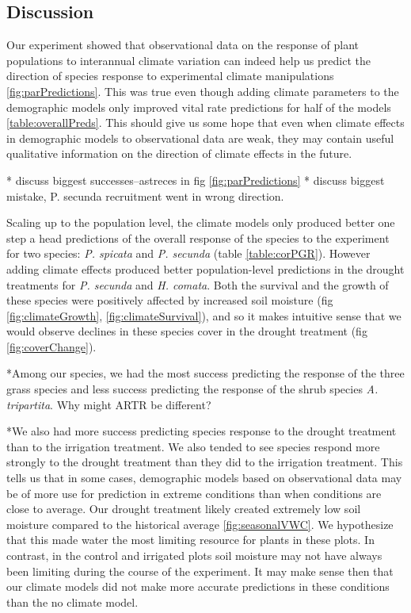 \documentclass[11pt]{article}
\begin{document}
\begin{doublespacing}
\section*{Discussion}

Our experiment showed that observational data on the response of plant populations to interannual climate variation can indeed help us predict the direction of species response to experimental climate manipulations \ref{fig:parPredictions}. This was true even though adding climate parameters to the demographic models only improved vital rate predictions for half of the models \ref{table:overallPreds}. This should give us some hope that even when climate effects in demographic models to observational data are weak, they may contain useful qualitative information on the direction of climate effects in the future. 

* discuss biggest successes--astreces in fig \ref{fig:parPredictions}
* discuss biggest mistake, P. secunda recruitment went in wrong direction. 
 
Scaling up to the population level, the climate models only produced better one step a head predictions of the overall response of the species to the experiment for two species: \textit{P. spicata} and \textit{P. secunda} (table \ref{table:corPGR}). However adding climate effects produced better population-level predictions in the drought treatments for \textit{P. secunda} and \textit{H. comata}.  Both the survival and the growth of these species were positively affected by increased soil moisture (fig \ref{fig:climateGrowth}, \ref{fig:climateSurvival}), and so it makes intuitive sense that we would observe declines in these species cover in the drought treatment (fig \ref{fig:coverChange}). 

*Among our species, we had the most success predicting the response of the three grass species and less success predicting the response of the shrub species \textit{A. tripartita}.    Why might ARTR be different? 

*We also had more success predicting species response to the drought treatment than to the irrigation treatment. We also tended to see species respond more strongly to the drought treatment than they did to the irrigation treatment.  This tells us that in some cases, demographic models based on observational data may be of more use for prediction in extreme conditions than when conditions are close to average.  Our drought treatment likely created extremely low soil moisture compared to the historical average \ref{fig:seasonalVWC}. We hypothesize that this made water the most limiting resource for plants in these plots. In contrast, in the control and irrigated plots soil moisture may not have always been limiting during the course of the experiment.  It may make sense then that our climate models did not make more accurate predictions in these conditions than the no climate model.


\end{doublespacing}
\end{document}
